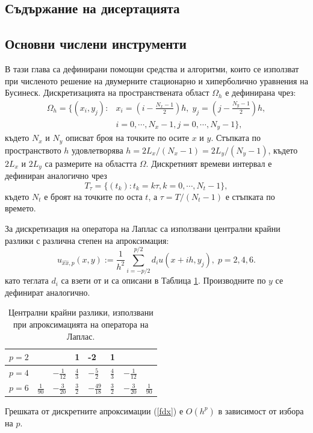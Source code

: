 \documentclass[a5paper]{article}
\newcommand{\be}{\begin{equation}}
\newcommand{\ee}{\end{equation}}
\newcommand{\rf}[1]{(\ref{#1})}
\theoremstyle{remark}
\begin{document}
\begin{normalsize}
\section{Съдържание на дисертацията}
 

\subsection{Основни числени инструменти}\label{numaBasic}
В тази глава са дефинирани помощни средства и алгоритми, които се използват при численото решение на двумерните стационарно и хиперболично уравнения на Бусинеск. Дискретизацията на пространствената област $\Omega_h$ е дефинирана чрез:
\begin{align}\label{Omega}
\Omega_h = \{(x_i,y_j):& x_i = (i-\frac{N_x-1}{2})h, \; y_j = (j-\frac{N_y-1}{2})h, \nonumber\\
                                   & i = 0,\cdots, N_x-1, j = 0 ,\cdots , N_y-1 \},
\end{align}
където $N_x$ и $N_y$ описват броя на точките по осите $x$ и $y$. Стъпката по пространството $h$ удовлетворява $h =2 L_x/(N_x-1) =2 L_y/(N_y-1)$, където $2 L_x$ и $2 L_y$ са размерите на областта $\Omega$. Дискретният времеви интервал е дефиниран аналогично чрез
\be
T_{\tau} = \{(t_k): t_k = k\tau, k = 0,\cdots ,N_t-1 \},
\ee
където $N_t$ е броят на точките по оста $t$, а $\tau = T/(N_t-1)$ е стъпката по времето.

За дискретизация на оператора на Лаплас са използвани централни крайни разлики с различна степен на апроксимация:
\begin{equation}\label{fdx}
u_{\widehat{xx},p}(x,y) :=  \frac{1}{h^2} \sum\limits_{i=-p/2}^{p/2} d_i u(x+ih, y_j), \; p=2,4,6.
\end{equation}
като теглата $d_i$ са взети от \cite{forn} и са описани в Таблица \ref{table:A00}. Производните по $y$ се дефинират аналогично.

\begin{table}[ht]
\centering
\small
		\begin{tabular}{||c|l|l|l|l|l|l|l||}
			\hline
			\hline
            $p=2$          &          &                                 &     1      &   -2   &    1    &    &        \\
   			\hline 
			\hline 
           $p=4$          &                            &   $-\frac{1}{12}$     &     $\frac{4}{3}$      &   $-\frac{5}{2} $     &    $\frac{4}{3}$    &  $-\frac{1}{12}$   &        \\
	   \hline
			\hline 
            $p=6$        &   $\frac{1}{90}$       &     $-\frac{3}{20}$     &    $\frac{3}{2}$      &    $-\frac{49}{18}$   &    $\frac{3}{2}$    & $-\frac{3}{20}$    &    $\frac{1}{90}$       \\
	   \hline
			\hline 
		\end{tabular}
	\caption{Централни крайни разлики, използвани при апроксимацията на оператора на Лаплас.}
	\label{table:A00}
\end{table}
Грешката от дискретните апроксимации \rf{fdx} е $O(h^p)$ в зависимост от избора на $p$.


\end{normalsize}
\end{document}
